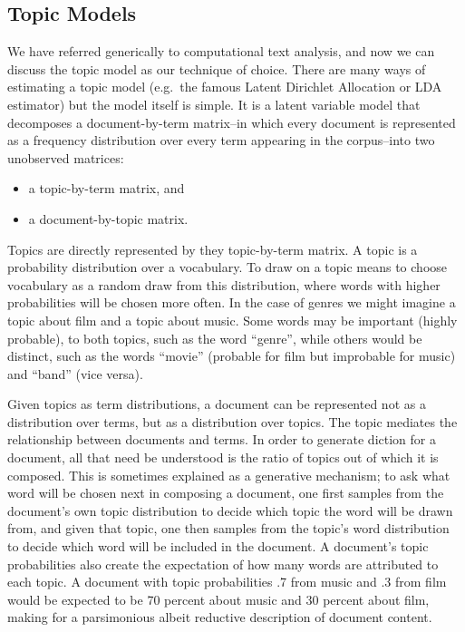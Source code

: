 \documentclass[]{book}
\providecommand{\tightlist}{%
  \setlength{\itemsep}{0pt}\setlength{\parskip}{0pt}}
\theoremstyle{definition}
\theoremstyle{definition}
\theoremstyle{definition}
\theoremstyle{remark}
\begin{document}
\hypertarget{topic-models}{%
\subsection{Topic Models}\label{topic-models}}

We have referred generically to computational text analysis, and now we
can discuss the topic model as our technique of choice. There are many
ways of estimating a topic model (e.g.~the famous Latent Dirichlet
Allocation or LDA estimator) but the model itself is simple. It is a
latent variable model that decomposes a document-by-term matrix--in
which every document is represented as a frequency distribution over
every term appearing in the corpus--into two unobserved matrices:

\begin{itemize}
\tightlist
\item
  a topic-by-term matrix, and
\item
  a document-by-topic matrix.
\end{itemize}

Topics are directly represented by they topic-by-term matrix. A topic is
a probability distribution over a vocabulary. To draw on a topic means
to choose vocabulary as a random draw from this distribution, where
words with higher probabilities will be chosen more often. In the case
of genres we might imagine a topic about film and a topic about music.
Some words may be important (highly probable), to both topics, such as
the word ``genre'', while others would be distinct, such as the words
``movie'' (probable for film but improbable for music) and ``band''
(vice versa).

Given topics as term distributions, a document can be represented not as
a distribution over terms, but as a distribution over topics. The topic
mediates the relationship between documents and terms. In order to
generate diction for a document, all that need be understood is the
ratio of topics out of which it is composed. This is sometimes explained
as a generative mechanism; to ask what word will be chosen next in
composing a document, one first samples from the document's own topic
distribution to decide which topic the word will be drawn from, and
given that topic, one then samples from the topic's word distribution to
decide which word will be included in the document. A document's topic
probabilities also create the expectation of how many words are
attributed to each topic. A document with topic probabilities .7 from
music and .3 from film would be expected to be 70 percent about music
and 30 percent about film, making for a parsimonious albeit reductive
description of document content.
\end{document}
